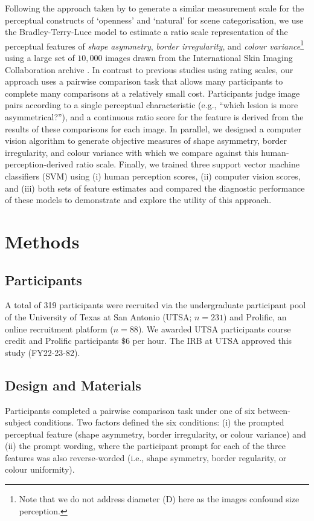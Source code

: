 \documentclass[
    man, 12pt, a4paper,
    donotrepeattitle, floatsintext, draftfirst
]{apa7}
\begin{document}
Following the approach taken by \cite{zhang2019establishing} to generate a similar measurement scale for the perceptual constructs of `openness' and `natural' for scene categorisation, we use the Bradley-Terry-Luce model \parencite[BTL; ][]{bradley1952rank} to estimate a ratio scale representation of the perceptual features of \textit{shape asymmetry}, \textit{border irregularity}, and \textit{colour variance}\footnote{Note that we do not address diameter (D) here as the images confound size perception.} using a large set of $10,000$ images drawn from the International Skin Imaging Collaboration archive \parencite{ISICref}.
In contrast to previous studies using rating scales, our approach uses a pairwise comparison task that allows many participants to complete many comparisons at a relatively small cost.
Participants judge image pairs according to a single perceptual characteristic (e.g., ``which lesion is more asymmetrical?''), and a continuous ratio score for the feature is derived from the results of these comparisons for each image.
In parallel, we designed a computer vision algorithm to generate objective measures of shape asymmetry, border irregularity, and colour variance with which we compare against this human-perception-derived ratio scale.
Finally, we trained three support vector machine classifiers (SVM) using (i) human perception scores, (ii) computer vision scores, and (iii) both sets of feature estimates and compared the diagnostic performance of these models to demonstrate and explore the utility of this approach.


\section{Methods}
\subsection{Participants}
A total of 319 participants were recruited via the undergraduate participant pool of the University of Texas at San Antonio (UTSA; $n=231$) and Prolific, an online recruitment platform ($n=88$). We awarded UTSA participants course credit and Prolific participants $\$6$ per hour. The IRB at UTSA approved this study (FY22-23-82).

\subsection{Design and Materials}
Participants completed a pairwise comparison task under one of six between-subject conditions. Two factors defined the six conditions: (i) the prompted perceptual feature (shape asymmetry, border irregularity, or colour variance) and (ii) the prompt wording, where the participant prompt for each of the three features was also reverse-worded (i.e., shape symmetry, border regularity, or colour uniformity).
\end{document}
